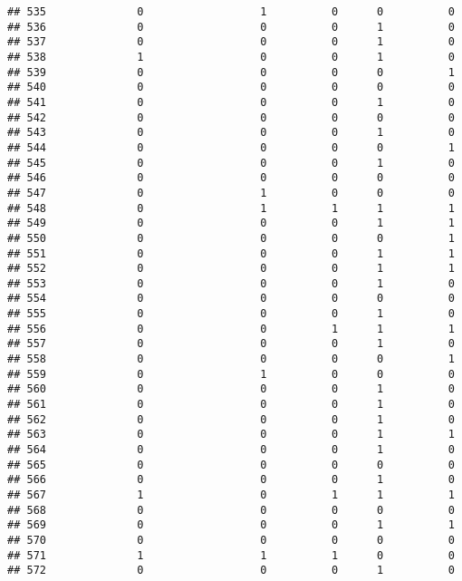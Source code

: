 \documentclass[
]{article}
\begin{document}
\begin{verbatim}
## 535              0                  1          0      0          0
## 536              0                  0          0      1          0
## 537              0                  0          0      1          0
## 538              1                  0          0      1          0
## 539              0                  0          0      0          1
## 540              0                  0          0      0          0
## 541              0                  0          0      1          0
## 542              0                  0          0      0          0
## 543              0                  0          0      1          0
## 544              0                  0          0      0          1
## 545              0                  0          0      1          0
## 546              0                  0          0      0          0
## 547              0                  1          0      0          0
## 548              0                  1          1      1          1
## 549              0                  0          0      1          1
## 550              0                  0          0      0          1
## 551              0                  0          0      1          1
## 552              0                  0          0      1          1
## 553              0                  0          0      1          0
## 554              0                  0          0      0          0
## 555              0                  0          0      1          0
## 556              0                  0          1      1          1
## 557              0                  0          0      1          0
## 558              0                  0          0      0          1
## 559              0                  1          0      0          0
## 560              0                  0          0      1          0
## 561              0                  0          0      1          0
## 562              0                  0          0      1          0
## 563              0                  0          0      1          1
## 564              0                  0          0      1          0
## 565              0                  0          0      0          0
## 566              0                  0          0      1          0
## 567              1                  0          1      1          1
## 568              0                  0          0      0          0
## 569              0                  0          0      1          1
## 570              0                  0          0      0          0
## 571              1                  1          1      0          0
## 572              0                  0          0      1          0

\end{verbatim}
\end{document}
